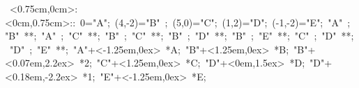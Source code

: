 \hbox{
\xy    <0.75cm,0cm>:<0cm,0.75cm>::
       0="A";     (4,-2)="B" ; (5,0)="C";  (1,2)="D";   
	   (-1,-2)="E"; 
	   "A" ; "B" **\dir{-}; 
       "A" ; "C" **\dir{-}; 
       "B" ; "C" **\dir{-}; 
       "B" ; "D" **\dir{-}; 
       "B" ; "E" **\dir{-}; 
       "C" ; "D" **\dir{-}; 
       "D" ; "E" **\dir{-}; 
       "A"+<-1.25em,0ex> *{A};
	   "B"+<1.25em,0ex> *{B};	   "B"+<0.07em,2.2ex> *{2};
       "C"+<1.25em,0ex> *{C};
       "D"+<0em,1.5ex> *{D};       "D"+<0.18em,-2.2ex> *{1};
       "E"+<-1.25em,0ex> *{E};
       \endxy}
